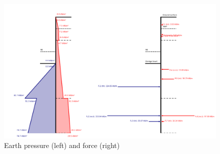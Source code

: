 \begin{figure}[H]
    \centering
    \includegraphics[width=0.90\linewidth]{figures/ch8/earth_pressure_force.png}
    \caption{Earth pressure (left) and force (right)}
    \label{fig:earth_pressure}
\end{figure}



